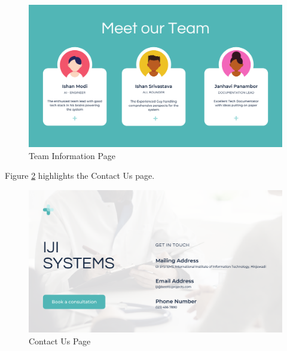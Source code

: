 \begin{figure}[H]
\includegraphics[scale=0.45]{Photos/webapp_5.png}
\caption{Team Information Page} \label{fig:webapp_5}
\end{figure}
Figure \ref{fig:webapp_6} highlights the Contact Us page.
\begin{figure}[H]
\includegraphics[scale=0.45]{Photos/webapp_6.png}
\caption{Contact Us Page} \label{fig:webapp_6}
\end{figure}